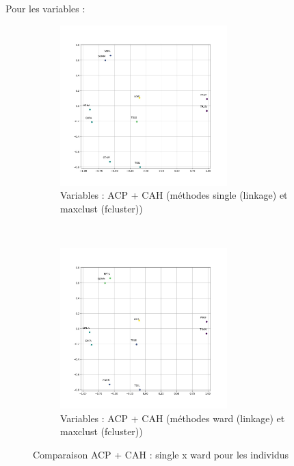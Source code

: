     Pour les variables :
    
    \begin{figure}[!htb]
        \begin{subfigure}[b]{1.0\textwidth}
            \centering
            \includegraphics[width=0.71\textwidth]{img/mixte_acp_cah/Projection_du_nuage_des_variables_dans_le_premier_plan_factoriel_cah_'single'_'maxclust'.jpg}
            \caption{Variables : ACP + CAH (méthodes single (linkage) et maxclust (fcluster))}
            \label{Label_Projection_du_nuage_des_variables_dans_le_premier_plan_factoriel_cah_'single'_'maxclust'.jpg}
        \end{subfigure}
        \\
        \begin{subfigure}[b]{1.0\textwidth}
            \centering
            \includegraphics[width=0.71\textwidth]{img/mixte_acp_cah/Projection_du_nuage_des_variables_dans_le_premier_plan_factoriel_cah_'ward'_'maxclust'.jpg}
            \caption{Variables : ACP + CAH (méthodes ward (linkage) et maxclust (fcluster))}
            \label{Label_Projection_du_nuage_des_variables_dans_le_premier_plan_factoriel__cah_'ward'_'maxclust'.jpg}
        \end{subfigure}
        \caption{Comparaison ACP + CAH : single x ward pour les individus}
    \end{figure}
    
